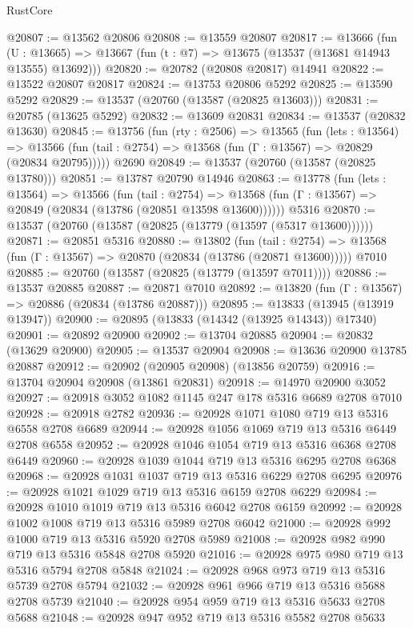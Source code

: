 \begin{lexlean}{RustCore}
\begin{coremodule}
@20807 := @13562 @20806
@20808 := @13559 @20807
@20817 := @13666
    (fun (U : @13665) => @13667 (fun (t : @7) => @13675 (@13537 (@13681 @14943 @13555) @13692)))
@20820 := @20782 (@20808 @20817) @14941
@20822 := @13522 @20807 @20817
@20824 := @13753 @20806 @5292
@20825 := @13590 @5292
@20829 := @13537 (@20760 (@13587 (@20825 @13603)))
@20831 := @20785 (@13625 @5292)
@20832 := @13609 @20831
@20834 := @13537 (@20832 @13630)
@20845 := @13756
    (fun (rty : @2506) =>
    @13565
      (fun (lets : @13564) =>
      @13566 (fun (tail : @2754) => @13568 (fun (Γ : @13567) => @20829 (@20834 @20795)))))
    @2690
@20849 := @13537 (@20760 (@13587 (@20825 @13780)))
@20851 := @13787 @20790 @14946
@20863 := @13778
    (fun (lets : @13564) =>
    @13566
      (fun (tail : @2754) =>
      @13568 (fun (Γ : @13567) => @20849 (@20834 (@13786 (@20851 @13598 @13600))))))
    @5316
@20870 := @13537 (@20760 (@13587 (@20825 (@13779 (@13597 (@5317 @13600))))))
@20871 := @20851 @5316
@20880 := @13802
    (fun (tail : @2754) => @13568 (fun (Γ : @13567) => @20870 (@20834 (@13786 (@20871 @13600)))))
    @7010
@20885 := @20760 (@13587 (@20825 (@13779 (@13597 @7011))))
@20886 := @13537 @20885
@20887 := @20871 @7010
@20892 := @13820 (fun (Γ : @13567) => @20886 (@20834 (@13786 @20887)))
@20895 := @13833 (@13945 (@13919 @13947))
@20900 := @20895 (@13833 (@14342 (@13925 @14343)) @17340)
@20901 := @20892 @20900
@20902 := @13704 @20885
@20904 := @20832 (@13629 @20900)
@20905 := @13537 @20904
@20908 := @13636 @20900 @13785 @20887
@20912 := @20902 (@20905 @20908) (@13856 @20759)
@20916 := @13704 @20904 @20908 (@13861 @20831)
@20918 := @14970 @20900 @3052
@20927 := @20918 @3052 @1082 @1145 @247 @178 @5316 @6689 @2708 @7010
@20928 := @20918 @2782
@20936 := @20928 @1071 @1080 @719 @13 @5316 @6558 @2708 @6689
@20944 := @20928 @1056 @1069 @719 @13 @5316 @6449 @2708 @6558
@20952 := @20928 @1046 @1054 @719 @13 @5316 @6368 @2708 @6449
@20960 := @20928 @1039 @1044 @719 @13 @5316 @6295 @2708 @6368
@20968 := @20928 @1031 @1037 @719 @13 @5316 @6229 @2708 @6295
@20976 := @20928 @1021 @1029 @719 @13 @5316 @6159 @2708 @6229
@20984 := @20928 @1010 @1019 @719 @13 @5316 @6042 @2708 @6159
@20992 := @20928 @1002 @1008 @719 @13 @5316 @5989 @2708 @6042
@21000 := @20928 @992 @1000 @719 @13 @5316 @5920 @2708 @5989
@21008 := @20928 @982 @990 @719 @13 @5316 @5848 @2708 @5920
@21016 := @20928 @975 @980 @719 @13 @5316 @5794 @2708 @5848
@21024 := @20928 @968 @973 @719 @13 @5316 @5739 @2708 @5794
@21032 := @20928 @961 @966 @719 @13 @5316 @5688 @2708 @5739
@21040 := @20928 @954 @959 @719 @13 @5316 @5633 @2708 @5688
@21048 := @20928 @947 @952 @719 @13 @5316 @5582 @2708 @5633

\end{coremodule}
\end{lexlean}
